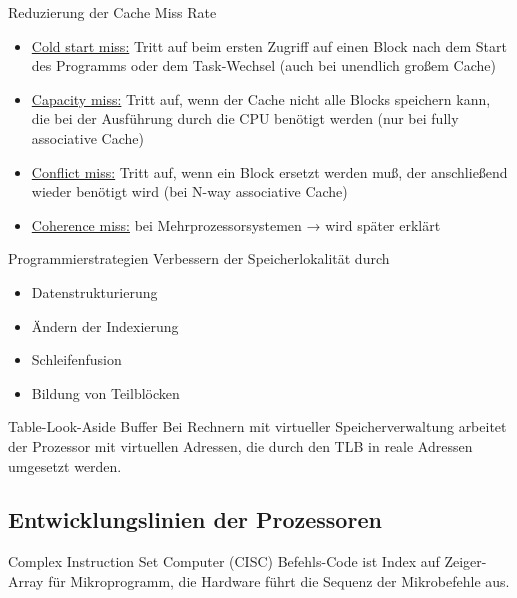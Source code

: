 \begin{defi}{Reduzierung der Cache Miss Rate}
    \begin{itemize}
        \item \underline{Cold start miss:} Tritt auf beim ersten Zugriff auf einen Block nach dem Start des Programms oder dem Task-Wechsel (auch bei unendlich großem Cache)
        \item \underline{Capacity miss:} Tritt auf, wenn der Cache nicht alle Blocks speichern kann, die bei der Ausführung durch die CPU benötigt werden (nur bei fully associative Cache)
        \item \underline{Conflict miss:} Tritt auf, wenn ein Block ersetzt werden muß, der anschließend wieder benötigt wird (bei N-way associative Cache)
        \item \underline{Coherence miss:} bei Mehrprozessorsystemen → wird später erklärt
    \end{itemize}
\end{defi}

\begin{defi}{Programmierstrategien}
    Verbessern der Speicherlokalität durch
    \begin{itemize}[\ldots]
        \item Datenstrukturierung
        \item Ändern der Indexierung
        \item Schleifenfusion
        \item Bildung von Teilblöcken
    \end{itemize}
\end{defi}

\begin{defi}{Table-Look-Aside Buffer}
    Bei Rechnern mit virtueller Speicherverwaltung arbeitet der Prozessor mit virtuellen Adressen, 
    die durch den TLB in reale Adressen umgesetzt werden.
\end{defi}

\subsection{Entwicklungslinien der Prozessoren}\label{subsec:entwicklungslinien-der-prozessoren}

\begin{defi}{Complex Instruction Set Computer (CISC)}
    Befehls-Code ist Index auf Zeiger-Array für Mikroprogramm,
    die Hardware führt die Sequenz der Mikrobefehle aus.
\end{defi}

